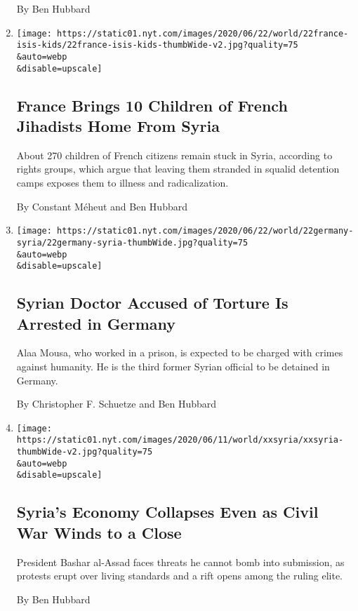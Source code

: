 \begin{enumerate}
  By Ben Hubbard
\item
  \href{/2020/06/22/world/europe/france-isis-children-repatriated.html}{}

  \texttt{[image: https://static01.nyt.com/images/2020/06/22/world/22france-isis-kids/22france-isis-kids-thumbWide-v2.jpg?quality=75\\\&auto=webp\\\&disable=upscale]}

  \hypertarget{france-brings-10-children-of-french-jihadists-home-from-syria}{%
  \subsection{France Brings 10 Children of French Jihadists Home From
  Syria}\label{france-brings-10-children-of-french-jihadists-home-from-syria}}

  About 270 children of French citizens remain stuck in Syria, according
  to rights groups, which argue that leaving them stranded in squalid
  detention camps exposes them to illness and radicalization.

  By Constant Méheut and Ben Hubbard
\item
  \href{/2020/06/22/world/europe/syria-doctor-torture-germany.html}{}

  \texttt{[image: https://static01.nyt.com/images/2020/06/22/world/22germany-syria/22germany-syria-thumbWide.jpg?quality=75\\\&auto=webp\\\&disable=upscale]}

  \hypertarget{syrian-doctor-accused-of-torture-is-arrested-in-germany}{%
  \subsection{Syrian Doctor Accused of Torture Is Arrested in
  Germany}\label{syrian-doctor-accused-of-torture-is-arrested-in-germany}}

  Alaa Mousa, who worked in a prison, is expected to be charged with
  crimes against humanity. He is the third former Syrian official to be
  detained in Germany.

  By Christopher F. Schuetze and Ben Hubbard
\item
  \href{/2020/06/15/world/middleeast/syria-economy-assad-makhlouf.html}{}

  \texttt{[image: https://static01.nyt.com/images/2020/06/11/world/xxsyria/xxsyria-thumbWide-v2.jpg?quality=75\\\&auto=webp\\\&disable=upscale]}

  \hypertarget{syrias-economy-collapses-even-as-civil-war-winds-to-a-close}{%
  \subsection{Syria's Economy Collapses Even as Civil War Winds to a
  Close}\label{syrias-economy-collapses-even-as-civil-war-winds-to-a-close}}

  President Bashar al-Assad faces threats he cannot bomb into
  submission, as protests erupt over living standards and a rift opens
  among the ruling elite.

  By Ben Hubbard
\end{enumerate}

